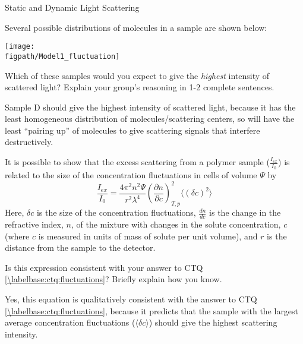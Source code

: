 \begin{activity}{Static and Dynamic Light Scattering}
\begin{ctqs}
\begin{enumerate}
		\end{enumerate}
		
	\question Several possible distributions of molecules in a sample are shown below: \label{\labelbase:ctq:fluctuations}
	
	\centerline{\texttt{[image: \\figpath/Model1\_fluctuation]}}
	
		Which of these samples would you expect to give the \emph{highest} intensity of scattered light?  Explain your group's reasoning in 1-2 complete sentences.
	
		\begin{solution}[1in]{}
			Sample D should give the highest intensity of scattered light, because it has the least homogeneous distribution of molecules/scattering centers, so will have the least ``pairing up'' of molecules to give scattering signals that interfere destructively.
		\end{solution}

\end{ctqs}

\begin{infobox}
	It is possible to show that the excess scattering from a polymer sample ($\frac{I_{ex}}{I_0}$) is related to the size of the concentration fluctuations in cells of volume $\Psi$ by
	\begin{equation*}
		\frac{I_{ex}}{I_0} = \frac{4 \pi^2 n^2 \Psi}{r^2 \lambda^4}\left(\frac{\partial n}{\partial c}\right)^2_{T,p} \langle ( \delta c )^2 \rangle
	\end{equation*}
	Here, $\delta c$ is the size of the concentration fluctuations,  $\frac{d n}{dc}$ is the change in the refractive index,  $n$, of the mixture with changes in the solute concentration, $c$ (where $c$ is measured in units of mass of solute per unit volume), and $r$ is the distance from the sample to the detector.
\end{infobox}

\begin{ctqs}

	\question Is this expression consistent with your answer to CTQ \ref{\labelbase:ctq:fluctuations}?  Briefly explain how you know.
	
		\begin{solution}[1in]{}
		
			Yes, this equation is qualitatively consistent with the answer to CTQ \ref{\labelbase:ctq:fluctuations}, because it predicts that the sample with the largest average concentration fluctuations ($\langle \delta c\rangle$) should give the highest scattering intensity.
			

\end{solution}
\end{ctqs}
\end{activity}
